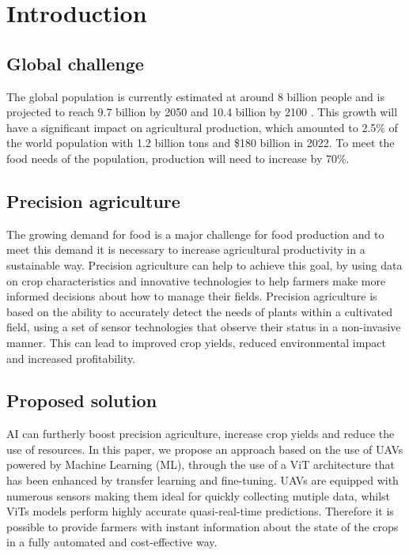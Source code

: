 \section{Introduction}
\label{sec:introduction}

\subsection{Global challenge}

The global population is currently estimated at around 8 billion people and is projected to reach 9.7 billion by 2050 and 10.4 billion by 2100 \cite{fao2023}. This growth will have a significant impact on agricultural production, which amounted to 2.5\% of the world population with 1.2 billion tons and \$180 billion in 2022. To meet the food needs of the population, production will need to increase by 70\%\cite{unpd22}.

\subsection{Precision agriculture}

The growing demand for food is a major challenge for food production and to meet this demand it is necessary to increase agricultural productivity in a sustainable way. Precision agriculture can help to achieve this goal, by using data on crop characteristics and innovative technologies to help farmers make more informed decisions about how to manage their fields. Precision agriculture is based on the ability to accurately detect the needs of plants within a cultivated field, using a set of sensor technologies that observe their status in a non-invasive manner. This can lead to improved crop yields, reduced environmental impact and increased profitability.

\subsection{Proposed solution}

AI can furtherly boost precision agriculture, increase crop yields and reduce the use of resources. In this paper, we propose an approach based on the use of UAVs powered by Machine Learning (ML), through the use of a ViT architecture that has been enhanced by transfer learning and fine-tuning. UAVs are equipped with numerous sensors making them ideal for quickly collecting mutiple data, whilst ViTs models perform highly accurate quasi-real-time predictions. Therefore it is possible to provide farmers with instant information about the state of the crops in a fully automated and cost-effective way.
